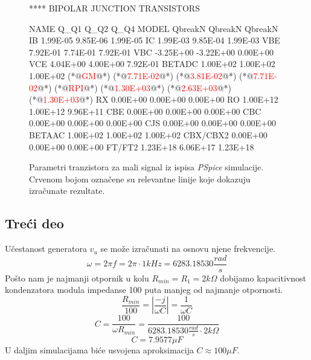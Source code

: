 \documentclass{article}
\begin{document}
            \begin{figure}[H]
                \centering
                \begin{spiceoutput}
**** BIPOLAR JUNCTION TRANSISTORS


NAME         Q_Q1        Q_Q2        Q_Q4     
MODEL        QbreakN     QbreakN     QbreakN  
IB           1.99E-05    9.85E-06    1.99E-05 
IC           1.99E-03    9.85E-04    1.99E-03 
VBE          7.92E-01    7.74E-01    7.92E-01 
VBC         -3.25E+00   -3.22E+00    0.00E+00 
VCE          4.04E+00    4.00E+00    7.92E-01 
BETADC       1.00E+02    1.00E+02    1.00E+02 
(*@\textcolor{red}{GM}@*)           (*@\textcolor{red}{7.71E-02}@*)      (*@\textcolor{red}{3.81E-02}@*)     (*@\textcolor{red}{7.71E-02}@*) 
(*@\textcolor{red}{RPI}@*)          (*@\textcolor{red}{1.30E+03}@*)      (*@\textcolor{red}{2.63E+03}@*)     (*@\textcolor{red}{1.30E+03}@*) 
RX           0.00E+00    0.00E+00    0.00E+00 
RO           1.00E+12    1.00E+12    9.96E+11 
CBE          0.00E+00    0.00E+00    0.00E+00 
CBC          0.00E+00    0.00E+00    0.00E+00 
CJS          0.00E+00    0.00E+00    0.00E+00 
BETAAC       1.00E+02    1.00E+02    1.00E+02 
CBX/CBX2     0.00E+00    0.00E+00    0.00E+00 
FT/FT2       1.23E+18    6.06E+17    1.23E+18 
                \end{spiceoutput}
                \caption{Parametri tranzistora za mali signal iz ispisa \textit{PSpice} simulacije. Crvenom bojom označene su relevantne linije koje dokazuju izračunate rezultate.}
                \label{Drugi}
            \end{figure}

        \subsection{Treći deo}
            Učestanost generatora $v_u$ se može izračunati na osnovu njene frekvencije.
            \begin{equation}
                \label{omega}
                \omega = 2\pi f = 2\pi \cdot 1kHz = 6283.18530 \frac{rad}{s}
            \end{equation}
            Pošto nam je najmanji otpornik u kolu $R_{min} = R_1 = 2k\Omega$ dobijamo kapacitivnost kondenzatora modula impedanse 100 puta manjeg od najmanje otpornosti.
            $$\frac{R_{min}}{100} = \left| \frac{-j}{\omega C} \right| = \frac{1}{\omega C}$$
            $$C = \frac{100}{\omega R_{min}} = \frac{100}{6283.18530 \frac{rad}{s} \cdot 2k\Omega}$$
            $$\boxed{C = 7.9577\mu F}$$
            U daljim simulacijama biće usvojena aproksimacija $C \approx 100\mu F$.
\end{document}
